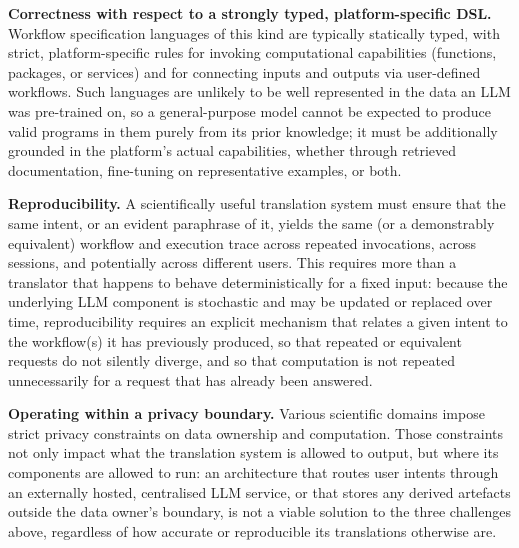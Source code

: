 \textbf{Correctness with respect to a strongly typed, platform-specific
DSL.} Workflow specification languages of this kind are typically statically
typed, with strict, platform-specific rules for invoking computational
capabilities (functions, packages, or services) and for connecting
inputs and outputs via user-defined workflows. Such languages are unlikely to be well represented in the
data an LLM was pre-trained on, so a general-purpose model cannot be expected
to produce valid programs in them purely from its prior knowledge; it must be
additionally grounded in the platform's actual capabilities, whether through
retrieved documentation, fine-tuning on representative examples, or both.

\textbf{Reproducibility.} A scientifically useful translation system must
ensure that the same intent, or an evident paraphrase of it, yields the same
(or a demonstrably equivalent) workflow and execution trace across repeated
invocations, across sessions, and potentially across different users. This
requires more than a translator that happens to behave deterministically for
a fixed input: because the underlying LLM component is stochastic and may be
updated or replaced over time, reproducibility requires an explicit mechanism
that relates a given intent to the workflow(s) it has previously produced, so
that repeated or equivalent requests do not silently diverge, and so that
computation is not repeated unnecessarily for a request that has
already been answered.

\textbf{Operating within a privacy boundary.} Various scientific domains impose
strict privacy constraints on data ownership and computation. 
Those constraints not only impact what the translation
system is allowed to output, but where its components are allowed to run: an
architecture that routes user intents through an externally hosted, centralised LLM
service, or that stores any derived artefacts outside the data owner's
boundary, is not a viable solution to the three challenges above, regardless
of how accurate or reproducible its translations otherwise are.

